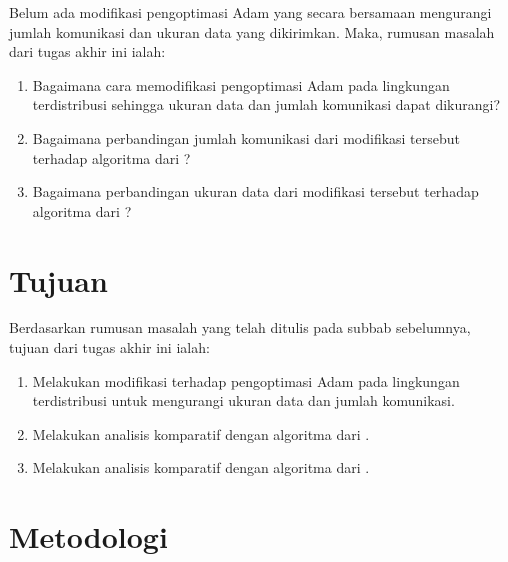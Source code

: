 Belum ada modifikasi pengoptimasi Adam yang secara bersamaan mengurangi jumlah komunikasi dan ukuran data yang dikirimkan. Maka, rumusan masalah dari tugas akhir ini ialah:

\begin{enumerate}
    \item Bagaimana cara memodifikasi pengoptimasi Adam pada lingkungan terdistribusi sehingga ukuran data dan jumlah komunikasi dapat dikurangi?
    \item Bagaimana perbandingan jumlah komunikasi dari modifikasi tersebut terhadap algoritma dari \textcite{Chen2021CADA}?
    \item Bagaimana perbandingan ukuran data dari modifikasi tersebut terhadap algoritma dari \textcite{Chen2022Efficient}?
\end{enumerate}

\section{Tujuan}

Berdasarkan rumusan masalah yang telah ditulis pada subbab sebelumnya, tujuan dari tugas akhir ini ialah:
\begin{enumerate}
    \item Melakukan modifikasi terhadap pengoptimasi Adam pada lingkungan terdistribusi untuk mengurangi ukuran data dan jumlah komunikasi.
    \item Melakukan analisis komparatif dengan algoritma dari \textcite{Chen2021CADA}.
    \item Melakukan analisis komparatif dengan algoritma dari \textcite{Chen2022Efficient}.
\end{enumerate}



\section{Metodologi}

